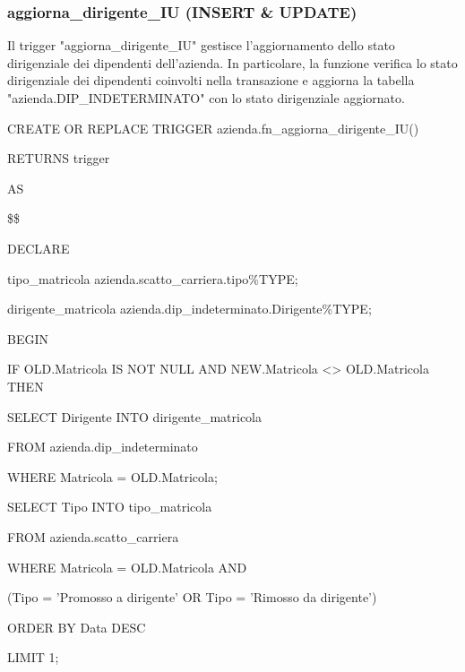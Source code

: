         \subsubsection{aggiorna\_dirigente\_IU (INSERT \& UPDATE)}
        Il trigger "aggiorna\_dirigente\_IU" gestisce l'aggiornamento dello stato dirigenziale dei dipendenti dell'azienda. In particolare, la funzione verifica lo stato dirigenziale dei dipendenti coinvolti nella transazione e aggiorna la tabella "azienda.DIP\_INDETERMINATO" con lo stato dirigenziale aggiornato.
        \ttfamily
            \begin{flushleft}
                \begin{description}
                    \item CREATE OR REPLACE TRIGGER azienda.fn\_aggiorna\_dirigente\_IU()  
                    \item RETURNS trigger
                    \item AS
                    \item \$\$
                    \item DECLARE
                    \begin{description}
                        \item tipo\_matricola azienda.scatto\_carriera.tipo\%TYPE;
                        \item dirigente\_matricola azienda.dip\_indeterminato.Dirigente\%TYPE;
                    \end{description}
                    \item BEGIN 
                    \begin{description}
                        \item IF OLD.Matricola IS NOT NULL AND NEW.Matricola <> OLD.Matricola THEN
                        \begin{description}
                            \item SELECT Dirigente INTO dirigente\_matricola
                            \item FROM azienda.dip\_indeterminato
                            \item WHERE Matricola = OLD.Matricola;

                            \vspace{0.5cm}

                            \item SELECT Tipo INTO tipo\_matricola
                            \item FROM azienda.scatto\_carriera
                            \item WHERE Matricola = OLD.Matricola AND 
                                  \item (Tipo = 'Promosso a dirigente' OR Tipo = 'Rimosso da dirigente')
                            \item ORDER BY Data DESC
                            \item LIMIT 1;


\end{description}
\end{description}
\end{description}
\end{flushleft}
